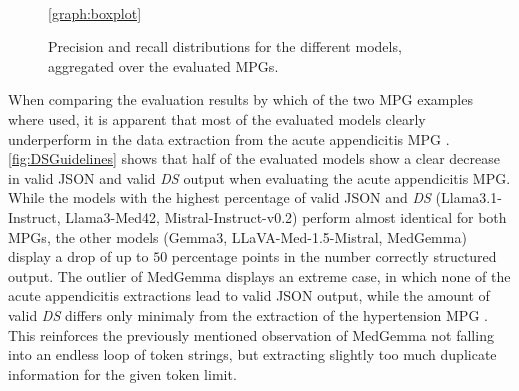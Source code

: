 \documentclass[bs, english]{stthesis}
\edef\HGPTRec{\pgfplotsretval}
\edef\AGPTRec{\pgfplotsretval}
\begin{document}
\begin{figure}[]
  \\
  \ref{graph:boxplot}
  \caption{Precision and recall distributions for the different models, aggregated over the evaluated MPGs.}
  \label{fig:prerecGuidelines}
\end{figure}

When comparing the evaluation results by which of the two MPG examples where used, it is apparent that most of the evaluated models clearly underperform in the data extraction from the acute appendicitis MPG \cite{snyderAcuteAppendicitisEfficient2018}.
\cref{fig:DSGuidelines} shows that half of the evaluated models show a clear decrease in valid JSON and valid \textit{DS} output when evaluating the acute appendicitis MPG. While the models with the highest percentage of valid JSON and \textit{DS} (Llama3.1-Instruct, Llama3-Med42, Mistral-Instruct-v0.2) perform almost identical for both MPGs, the other models (Gemma3, LLaVA-Med-1.5-Mistral, MedGemma) display a drop of up to $50$ percentage points in the number correctly structured output. The outlier of MedGemma displays an extreme case, in which none of the acute appendicitis extractions lead to valid JSON output, while the amount of valid \textit{DS} differs only minimaly from the extraction of the hypertension MPG \cite{mcevoy2024ESCGuidelines2024}. This reinforces the previously mentioned observation of MedGemma not falling into an endless loop of token strings, but extracting slightly too much duplicate information for the given token limit.
\end{document}
